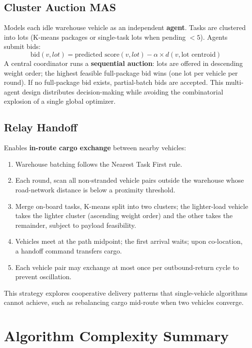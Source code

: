 \subsection{Cluster Auction MAS}

Models each idle warehouse vehicle as an independent \textbf{agent}. Tasks are clustered into lots (K-means packages or single-task lots when pending $< 5$). Agents submit bids:
\begin{equation}
    \text{bid}(v, lot) = \text{predicted score}(v, lot) - \alpha \times d(v, \text{lot centroid})
\end{equation}
A central coordinator runs a \textbf{sequential auction}: lots are offered in descending weight order; the highest feasible full-package bid wins (one lot per vehicle per round). If no full-package bid exists, partial-batch bids are accepted. This multi-agent design distributes decision-making while avoiding the combinatorial explosion of a single global optimizer.

\subsection{Relay Handoff}

Enables \textbf{in-route cargo exchange} between nearby vehicles:
\begin{enumerate}[leftmargin=4em]
    \item Warehouse batching follows the Nearest Task First rule.
    \item Each round, scan all non-stranded vehicle pairs outside the warehouse whose road-network distance is below a proximity threshold.
    \item Merge on-board tasks, K-means split into two clusters; the lighter-load vehicle takes the lighter cluster (ascending weight order) and the other takes the remainder, subject to payload feasibility.
    \item Vehicles meet at the path midpoint; the first arrival waits; upon co-location, a handoff command transfers cargo.
    \item Each vehicle pair may exchange at most once per outbound-return cycle to prevent oscillation.
\end{enumerate}

This strategy explores cooperative delivery patterns that single-vehicle algorithms cannot achieve, such as rebalancing cargo mid-route when two vehicles converge.

\section{Algorithm Complexity Summary}

